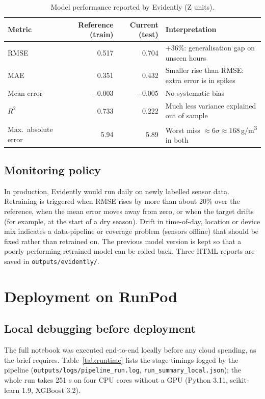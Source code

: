 \documentclass[11pt,a4paper]{article}
\newcommand{\ugm}{\,\textmu g/m\textsuperscript{3}}
\begin{document}
\begin{table}[H]
\centering\small
\caption{Model performance reported by Evidently (Z units).}
\label{tab:perf}
\begin{tabular}{lrrL{6.5cm}}
\toprule
Metric & Reference (train) & Current (test) & Interpretation \\
\midrule
RMSE & 0.517 & 0.704 & +36\%: generalisation gap on unseen hours \\
MAE & 0.351 & 0.432 & Smaller rise than RMSE: extra error is in spikes \\
Mean error & $-0.003$ & $-0.005$ & No systematic bias \\
$R^2$ & 0.733 & 0.222 & Much less variance explained out of sample \\
Max.\ absolute error & 5.94 & 5.89 & Worst miss $\approx 6\sigma \approx 168$\ugm{} in both \\
\bottomrule
\end{tabular}
\end{table}

\subsection{Monitoring policy}
In production, Evidently would run daily on newly labelled sensor data. Retraining is triggered when RMSE rises by more than about 20\% over the reference, when the mean error moves away from zero, or when the target drifts (for example, at the start of a dry season). Drift in time-of-day, location or device mix indicates a data-pipeline or coverage problem (sensors offline) that should be fixed rather than retrained on. The previous model version is kept so that a poorly performing retrained model can be rolled back. Three HTML reports are saved in \texttt{outputs/evidently/}.

\section{Deployment on RunPod}
\subsection{Local debugging before deployment}
The full notebook was executed end-to-end locally before any cloud spending, as the brief requires. Table~\ref{tab:runtime} lists the stage timings logged by the pipeline (\texttt{outputs/logs/pipeline\_run.log}, \texttt{run\_summary\_local.json}); the whole run takes 251 s on four CPU cores without a GPU (Python 3.11, scikit-learn 1.9, XGBoost 3.2).
\end{document}
